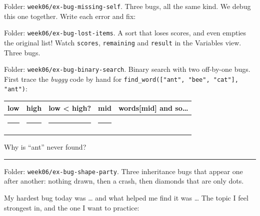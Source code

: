 \begin{exercise}
Folder: \texttt{week06/ex-bug-missing-self}. Three bugs, all the same kind. We debug this one together. Write each error and fix:
\end{exercise}

\begin{exercise}
Folder: \texttt{week06/ex-bug-lost-items}. A sort that loses scores, and even empties the original list! Watch \texttt{scores}, \texttt{remaining} and \texttt{result} in the Variables view. Three bugs.
\end{exercise}

\begin{exercise}
Folder: \texttt{week06/ex-bug-binary-search}. Binary search with two off-by-one bugs. First trace the \emph{buggy} code by hand for \texttt{find\_word(["ant", "bee", "cat"], "ant")}:
\begin{center}
\renewcommand{\arraystretch}{1.4}
\begin{tabular}{|c|c|c|c|p{5.2cm}|}
\hline
\textbf{low} & \textbf{high} & \textbf{low < high?} & \textbf{mid} & \textbf{words[mid] and so\ldots} \\ \hline
\rule{1cm}{0pt} & \rule{1cm}{0pt} & \rule{1.8cm}{0pt} & \rule{1cm}{0pt} & \\ \hline
 & & & & \\ \hline
\end{tabular}
\end{center}
Why is \enquote{ant} never found? \rule{7cm}{0.4pt}
\end{exercise}

\begin{exercise}
Folder: \texttt{week06/ex-bug-shape-party}. Three inheritance bugs that appear one after another: nothing drawn, then a crash, then diamonds that are only dots.
\end{exercise}

\begin{vocab}
\end{vocab}

\begin{reflection}
My hardest bug today was \ldots{} and what helped me find it was \ldots
{}
The topic I feel strongest in, and the one I want to practice:
\end{reflection}
